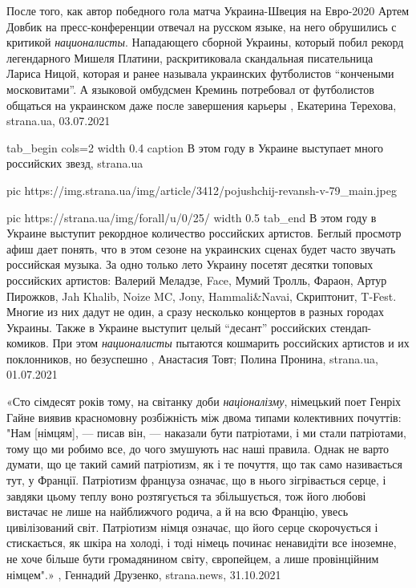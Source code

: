 После того, как автор победного гола матча Украина-Швеция на Евро-2020 Артем
Довбик на пресс-конференции отвечал на русском языке, на него обрушились с
критикой \emph{националисты}.  Нападающего сборной Украины, который побил
рекорд легендарного Мишеля Платини, раскритиковала скандальная писательница
Лариса Ницой, которая и ранее называла украинских футболистов
\enquote{кончеными московитами}. А языковой омбудсмен Креминь потребовал от
футболистов общаться на украинском даже после завершения карьеры
, 
Екатерина Терехова, strana.ua, 03.07.2021

\ifcmt
tab_begin cols=2
	width 0.4
	caption В этом году в Украине выступает много российских звезд, strana.ua

  pic https://img.strana.ua/img/article/3412/pojushchij-revansh-v-79_main.jpeg

	pic https://strana.ua/img/forall/u/0/25/%
	width 0.5
tab_end
\fi
В этом году в Украине выступит рекордное количество российских артистов.
Беглый просмотр афиш дает понять, что в этом сезоне на украинских сценах будет
часто звучать российская музыка. За одно только лето Украину посетят десятки
топовых российских артистов: Валерий Меладзе, Face, Мумий Тролль, Фараон, Артур
Пирожков, Jah Khalib, Noize MC, Jony, Hammali\&Navai, Скриптонит, T-Fest.
Многие из них дадут не один, а сразу несколько концертов в разных городах
Украины.  Также в Украине выступит целый \enquote{десант} российских стендап-комиков.
При этом \emph{националисты} пытаются кошмарить российских артистов и их поклонников,
но безуспешно
, 
Анастасия Товт; Полина Пронина, strana.ua, 01.07.2021

«Сто сімдесят років тому, на світанку доби \emph{націоналізму}, німецький поет Генріх
Гайне виявив красномовну розбіжність між двома типами колективних почуттів:
"Нам [німцям], — писав він, — наказали бути патріотами, і ми стали патріотами,
тому що ми робимо все, до чого змушують нас наші правила. Однак не варто
думати, що це такий самий патріотизм, як і те почуття, що так само називається
тут, у Франції.  Патріотизм француза означає, що в нього зігрівається серце, і
завдяки цьому теплу воно розтягується та збільшується, тож його любові вистачає
не лише на найближчого родича, а й на всю Францію, увесь цивілізований світ.
Патріотизм німця означає, що його серце скорочується і стискається, як шкіра на
холоді, і тоді німець починає ненавидіти все іноземне, не хоче більше бути
громадянином світу, європейцем, а лише провінційним німцем".»
, 
Геннадий Друзенко, strana.news, 31.10.2021

